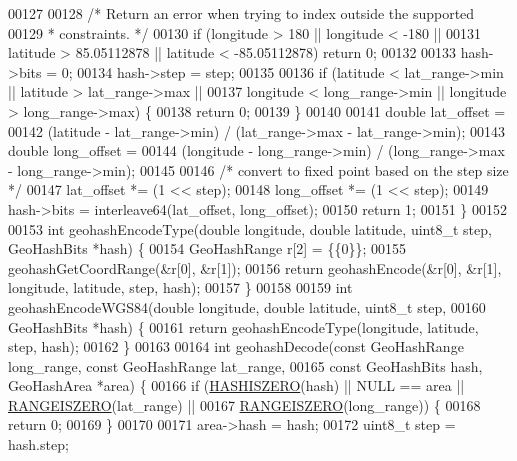\begin{DoxyCode}
00127 
00128     \textcolor{comment}{/* Return an error when trying to index outside the supported}
00129 \textcolor{comment}{     * constraints. */}
00130     \textcolor{keywordflow}{if} (longitude > 180 || longitude < -180 ||
00131         latitude > 85.05112878 || latitude < -85.05112878) \textcolor{keywordflow}{return} 0;
00132 
00133     hash->bits = 0;
00134     hash->step = step;
00135 
00136     \textcolor{keywordflow}{if} (latitude < lat\_range->min || latitude > lat\_range->max ||
00137         longitude < long\_range->min || longitude > long\_range->max) \{
00138         \textcolor{keywordflow}{return} 0;
00139     \}
00140 
00141     \textcolor{keywordtype}{double} lat\_offset =
00142         (latitude - lat\_range->min) / (lat\_range->max - lat\_range->min);
00143     \textcolor{keywordtype}{double} long\_offset =
00144         (longitude - long\_range->min) / (long\_range->max - long\_range->min);
00145 
00146     \textcolor{comment}{/* convert to fixed point based on the step size */}
00147     lat\_offset *= (1 << step);
00148     long\_offset *= (1 << step);
00149     hash->bits = interleave64(lat\_offset, long\_offset);
00150     \textcolor{keywordflow}{return} 1;
00151 \}
00152 
00153 \textcolor{keywordtype}{int} geohashEncodeType(\textcolor{keywordtype}{double} longitude, \textcolor{keywordtype}{double} latitude, uint8\_t step, GeoHashBits *hash) \{
00154     GeoHashRange r[2] = \{\{0\}\};
00155     geohashGetCoordRange(&r[0], &r[1]);
00156     \textcolor{keywordflow}{return} geohashEncode(&r[0], &r[1], longitude, latitude, step, hash);
00157 \}
00158 
00159 \textcolor{keywordtype}{int} geohashEncodeWGS84(\textcolor{keywordtype}{double} longitude, \textcolor{keywordtype}{double} latitude, uint8\_t step,
00160                        GeoHashBits *hash) \{
00161     \textcolor{keywordflow}{return} geohashEncodeType(longitude, latitude, step, hash);
00162 \}
00163 
00164 \textcolor{keywordtype}{int} geohashDecode(\textcolor{keyword}{const} GeoHashRange long\_range, \textcolor{keyword}{const} GeoHashRange lat\_range,
00165                    \textcolor{keyword}{const} GeoHashBits hash, GeoHashArea *area) \{
00166     \textcolor{keywordflow}{if} (\hyperlink{geohash_8h_a097b8152f901ce8d8537f70b7108d9d4}{HASHISZERO}(hash) || NULL == area || \hyperlink{geohash_8h_aa0025397de7ebbc5b0ee9bf2c1c64221}{RANGEISZERO}(lat\_range) ||
00167         \hyperlink{geohash_8h_aa0025397de7ebbc5b0ee9bf2c1c64221}{RANGEISZERO}(long\_range)) \{
00168         \textcolor{keywordflow}{return} 0;
00169     \}
00170 
00171     area->hash = hash;
00172     uint8\_t step = hash.step;

\end{DoxyCode}
